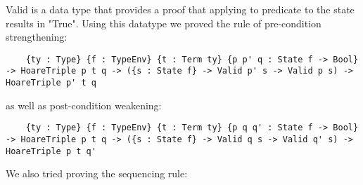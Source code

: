 \documentclass{article}
\begin{document}
Valid is a data type that provides a proof that applying to predicate to the state results in "True". Using this datatype we proved the rule of pre-condition strengthening:

\begin{lstlisting}
	{ty : Type} {f : TypeEnv} {t : Term ty} {p p' q : State f -> Bool} -> HoareTriple p t q -> ({s : State f} -> Valid p' s -> Valid p s) -> HoareTriple p' t q
\end{lstlisting}

as well as post-condition weakening:

\begin{lstlisting}
	{ty : Type} {f : TypeEnv} {t : Term ty} {p q q' : State f -> Bool} -> HoareTriple p t q -> ({s : State f} -> Valid q s -> Valid q' s) -> HoareTriple p t q'
\end{lstlisting}

We also tried proving the sequencing rule:
\end{document}
